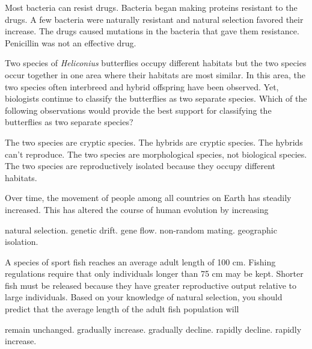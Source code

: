 \begin{choices}
\choice Most bacteria can resist drugs. 
\choice Bacteria began making proteins resistant to the drugs. 
\correctchoice A few bacteria were naturally resistant and natural selection favored their increase. 
\choice The drugs caused mutations in the bacteria that gave them resistance. 
\choice Penicillin was not an effective drug. 
\end{choices}

\question
Two species of \textit{Heliconius} butterflies occupy different habitats but the two species occur together in one area where their habitats are most similar. In this area, the two species often interbreed and hybrid offspring have been observed.  Yet, biologists continue to classify the butterflies as two separate species.  Which of the following observations would provide the best support for classifying the butterflies as two separate species? 

\begin{choices}
\choice The two species are cryptic species.
\choice The hybrids are cryptic species.
\correctchoice The hybrids can't reproduce.
\choice The two species are morphological species, not biological species.
\choice The two species are reproductively isolated because they occupy different habitats.
\end{choices}

\question
Over time, the movement of people among all countries on Earth has steadily increased. This has altered the course of human evolution by increasing

\begin{choices}
\choice natural selection. 
\choice genetic drift. 
\correctchoice gene flow. 
\choice non-random mating. 
\choice geographic isolation. 
\end{choices}

\newpage

\question
A species of sport fish reaches an average adult length of 100 cm. Fishing regulations require that only individuals longer than 75 cm may be kept. Shorter fish must be released because they have greater reproductive output relative to large individuals. Based on your knowledge of natural selection, you should predict that the average length of the adult fish population will

\begin{choices}
\correctchoice remain unchanged. 
\choice gradually increase. 
\choice gradually decline. 
\choice rapidly decline. 
\choice rapidly increase. 
\end{choices}

